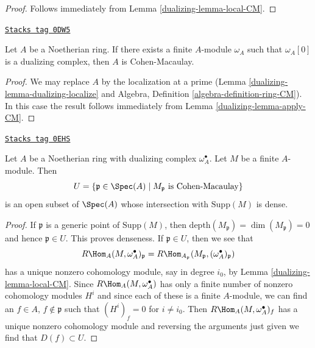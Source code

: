 \begin{proof}

Follows immediately from Lemma \ref{dualizing-lemma-local-CM}.
\end{proof}

\begin{lemma}
\label{dualizing-lemma-has-dualizing-module-CM}
\href{https://stacks.math.columbia.edu/tag/0DW5}{\texttt{Stacks tag 0DW5}}

Let $A$ be a Noetherian ring. If there exists a finite $A$-module
$\omega_A$ such that $\omega_A[0]$ is a dualizing complex, then
$A$ is Cohen-Macaulay.
\end{lemma}

\begin{proof}

We may replace $A$ by the localization at a prime
(Lemma \ref{dualizing-lemma-dualizing-localize} and
Algebra, Definition \ref{algebra-definition-ring-CM}).
In this case the result follows immediately from
Lemma \ref{dualizing-lemma-apply-CM}.
\end{proof}

\begin{lemma}[CM open]
\label{dualizing-lemma-CM-open}
\href{https://stacks.math.columbia.edu/tag/0EHS}{\texttt{Stacks tag 0EHS}}

Let $A$ be a Noetherian ring with dualizing complex $\omega_A^\bullet$.
Let $M$ be a finite $A$-module. Then
$$
U = \{\mathfrak p \in \Spec(A) \mid M_\mathfrak p\text{ is Cohen-Macaulay}\}
$$
is an open subset of $\Spec(A)$ whose intersection with
$\text{Supp}(M)$ is dense.
\end{lemma}

\begin{proof}

If $\mathfrak p$ is a generic point of $\text{Supp}(M)$, then
$\text{depth}(M_\mathfrak p) = \dim(M_\mathfrak p) = 0$
and hence $\mathfrak p \in U$. This proves denseness.
If $\mathfrak p \in U$, then we see that
$$
R\Hom_A(M, \omega_A^\bullet)_\mathfrak p =
R\Hom_{A_\mathfrak p}(M_\mathfrak p, (\omega_A^\bullet)_\mathfrak p)
$$
has a unique nonzero cohomology module, say in degree $i_0$, by
Lemma \ref{dualizing-lemma-local-CM}.
Since $R\Hom_A(M, \omega_A^\bullet)$
has only a finite number of nonzero cohomology modules $H^i$
and since each of these is a finite $A$-module, we can
find an $f \in A$, $f \not \in \mathfrak p$ such that
$(H^i)_f = 0$ for $i \not = i_0$. Then
$R\Hom_A(M, \omega_A^\bullet)_f$ has a unique nonzero cohomology
module and reversing the arguments just given we find
that $D(f) \subset U$.
\end{proof}

